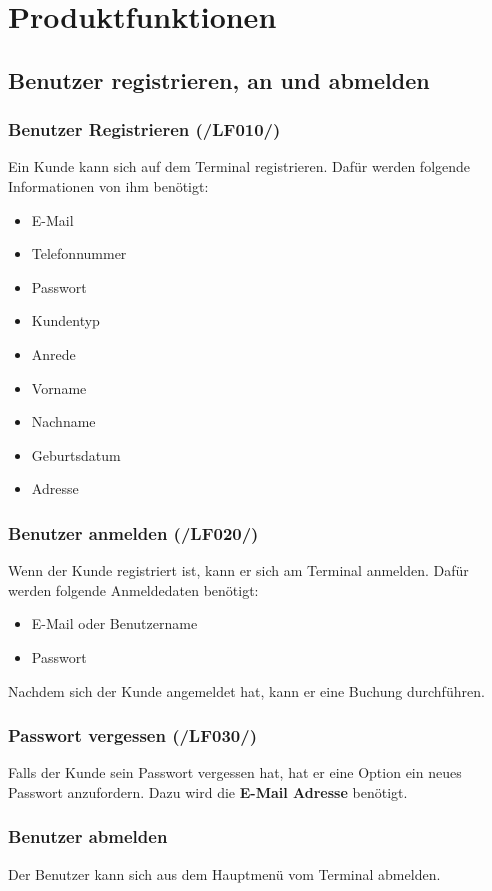 
\section{Produktfunktionen}
\subsection{Benutzer registrieren, an und abmelden}
\subsubsection{Benutzer Registrieren (/LF010/)}
Ein Kunde kann sich auf dem Terminal registrieren. Dafür werden folgende Informationen von ihm benötigt:
\begin{itemize}
    \item E-Mail
    \item Telefonnummer
    \item Passwort
    \item Kundentyp
    \item Anrede
    \item Vorname
    \item Nachname
    \item Geburtsdatum
    \item Adresse
\end{itemize}
\subsubsection{Benutzer anmelden (/LF020/)}
Wenn der Kunde registriert ist, kann er sich am Terminal anmelden. Dafür werden folgende Anmeldedaten benötigt:
\begin{itemize}
    \item E-Mail oder Benutzername
    \item Passwort
\end{itemize}
Nachdem sich der Kunde angemeldet hat, kann er eine Buchung durchführen.
\subsubsection{Passwort vergessen (/LF030/)}
Falls der Kunde sein Passwort vergessen hat, hat er eine Option ein neues Passwort anzufordern.
Dazu wird die \textbf{E-Mail Adresse} benötigt.
\subsubsection{Benutzer abmelden}
Der Benutzer kann sich aus dem Hauptmenü vom Terminal abmelden.
